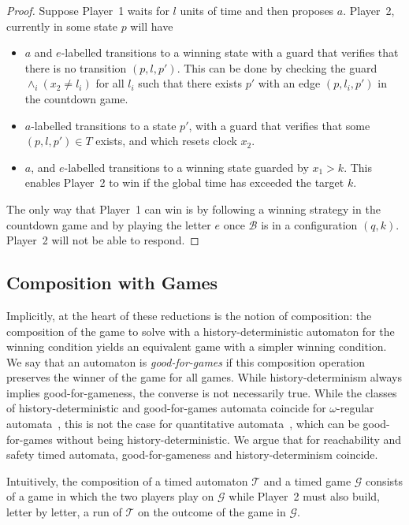 \documentclass[10pt,a4paper]{amsart}
\theoremstyle{definition}
\numberwithin{equation}{section}
\newcommand{\T}{\mathcal{T}}
\newcommand{\autb}{\mathcal{B}}
\newcommand{\gsgame}{\mathcal{G}}
\begin{document}
\begin{proof}
Suppose Player~1 waits for $l$ units of time and then proposes $a$. 
Player~2, currently in some state $p$ 
will have 
\begin{itemize}
    \item 
$a$ and $e$-labelled transitions to a winning state with a guard that verifies that
there is no transition $(p,l,p')$. 
This can be done by checking the guard $\wedge_{i} (x_2\neq l_i)$ for 
all $l_i$ such that there exists $p'$ with an edge $(p,l_i,p')$ in the countdown game.
\item $a$-labelled transitions to a state $p'$, with a guard that verifies that 
some $(p,l,p')\in T$ exists, and which resets clock $x_2$.
\item $a$, and $e$-labelled transitions to a winning state guarded by $x_1>k$.
    This enables Player~2 to win if the global time has exceeded the target $k$.
\end{itemize}
The only way that Player~1 can win is by following a winning strategy in the countdown game
and by playing the letter $e$ once $\autb$ is in a configuration $(q,k)$.
Player~2 will not be able to respond.
\end{proof}





\subsection{Composition with Games}

Implicitly, at the heart of these reductions is the notion of composition: the composition of the game to solve with a history-deterministic automaton for the winning condition yields an equivalent game with a simpler winning condition. We say that an automaton is \emph{good-for-games} if this composition operation preserves the winner of the game for all games. While history-determinism always implies good-for-gameness, the converse is not necessarily true. While the classes of history-deterministic and good-for-games automata coincide for $\omega$-regular automata~\cite{BL19}, this is not the case for quantitative automata~\cite{BL21}, which can be good-for-games without being history-deterministic. We argue that for reachability and safety timed automata, good-for-gameness and history-determinism coincide.



Intuitively, the composition of a timed automaton $\T$ and a timed game $\gsgame$ 
consists of a game in which the two players play on $\gsgame$ while Player~2 must also build, letter by letter, a run of $\T$ on the outcome of the game in $\gsgame$.
\end{document}
